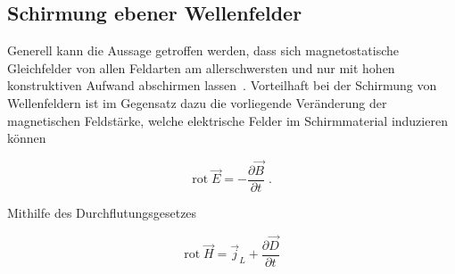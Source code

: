 \subsection{Schirmung ebener Wellenfelder}\label{cha:2_sub_Schirmung_ebener_Wellenfelder}

Generell kann die Aussage getroffen werden, dass sich magnetostatische Gleichfelder von allen Feldarten am allerschwersten und nur mit hohen konstruktiven Aufwand abschirmen lassen~\cite{EM_Schirmung}. Vorteilhaft bei der Schirmung von Wellenfeldern ist im Gegensatz dazu die vorliegende Veränderung der magnetischen Feldstärke, welche elektrische Felder im Schirmmaterial induzieren können~\cite{Maxwell}


\begin{equation}
    \text{rot} \; \vec E= - \frac{\partial \vec B}{\partial t} \; \text{.}
    \label{eq:2_Induktionsgesetz}
\end{equation}

Mithilfe des Durchflutungsgesetzes~\cite{Maxwell}

\begin{equation}
    \text{rot} \; \vec H = \vec j_L + \frac{\partial \vec D}{\partial t}
    \label{eq:2_Durchflutungsgesetz}
\end{equation}

